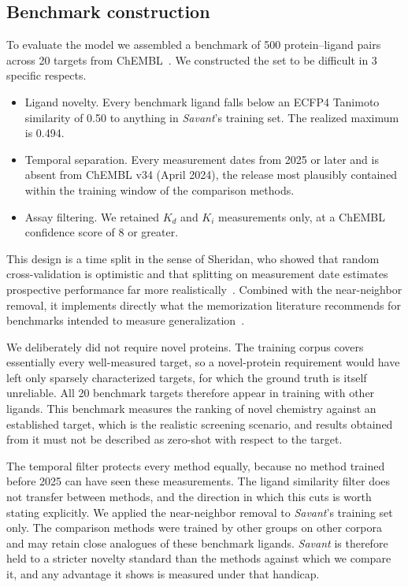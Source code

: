 \documentclass[times, twoside]{zHenriquesLab-StyleBioRxiv}
\newcommand{\savant}{\textit{Savant}\xspace}
\newcommand{\pl}{protein--ligand\xspace}
\begin{document}
\subsection*{Benchmark construction}

To evaluate the model we assembled a benchmark of 500 \pl pairs across 20 targets from ChEMBL~\cite{gaulton2012chembl,zdrazil2024chembl}. We constructed the set to be difficult in 3 specific respects.

\begin{itemize}
  \item Ligand novelty. Every benchmark ligand falls below an ECFP4 Tanimoto similarity of 0.50 to anything in \savant's training set. The realized maximum is 0.494.
  \item Temporal separation. Every measurement dates from 2025 or later and is absent from ChEMBL v34 (April 2024), the release most plausibly contained within the training window of the comparison methods.
  \item Assay filtering. We retained $K_d$ and $K_i$ measurements only, at a ChEMBL confidence score of 8 or greater.
\end{itemize}

This design is a time split in the sense of Sheridan, who showed that random cross-validation is optimistic and that splitting on measurement date estimates prospective performance far more realistically~\cite{sheridan2013timesplit}. Combined with the near-neighbor removal, it implements directly what the memorization literature recommends for benchmarks intended to measure generalization~\cite{wallach2018memorization,sieg2019bias}.

We deliberately did not require novel proteins. The training corpus covers essentially every well-measured target, so a novel-protein requirement would have left only sparsely characterized targets, for which the ground truth is itself unreliable. All 20 benchmark targets therefore appear in training with other ligands. This benchmark measures the ranking of novel chemistry against an established target, which is the realistic screening scenario, and results obtained from it must not be described as zero-shot with respect to the target.

The temporal filter protects every method equally, because no method trained before 2025 can have seen these measurements. The ligand similarity filter does not transfer between methods, and the direction in which this cuts is worth stating explicitly. We applied the near-neighbor removal to \savant's training set only. The comparison methods were trained by other groups on other corpora and may retain close analogues of these benchmark ligands. \savant is therefore held to a stricter novelty standard than the methods against which we compare it, and any advantage it shows is measured under that handicap.
\end{document}
